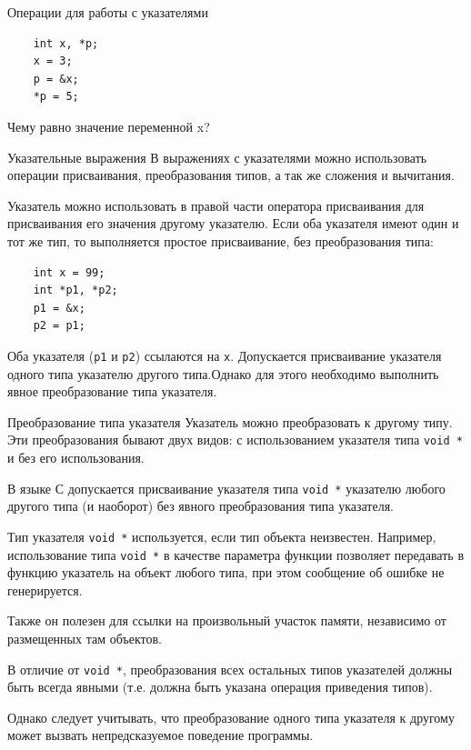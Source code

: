 \documentclass{beamer}
\begin{document}
\begin{frame}[fragile]{Операции для работы с указателями}
    \begin{verbatim}
    int x, *p;
    x = 3;
    p = &x;
    *p = 5;
    \end{verbatim}
    
    \medskip
    Чему равно значение переменной x?
\end{frame}

\begin{frame}[fragile]{Указательные выражения}
    В выражениях с указателями можно использовать операции присваивания, преобразования типов, а так же сложения и вычитания.
    
    \medskip
    Указатель можно использовать в правой части оператора присваивания для присваивания его значения другому указателю. Если оба указателя имеют один и тот же тип, то выполняется простое присваивание, без преобразования типа:
    \medskip
    \begin{verbatim}
    int x = 99;
    int *p1, *p2;
    p1 = &x;
    p2 = p1;
    \end{verbatim}
    \medskip
    
    Оба указателя (\texttt{p1} и \texttt{р2}) ссылаются на \texttt{х}. Допускается присваивание указателя одного типа указателю другого типа.Однако для этого необходимо выполнить явное преобразование типа указателя.
\end{frame}

\begin{frame}{Преобразование типа указателя}
    Указатель можно преобразовать к другому типу. Эти преобразования
    бывают двух видов: с использованием указателя типа \texttt{void *} и без его использования.
    
    \medskip
    В языке С допускается присваивание указателя типа \texttt{void *} указателю любого другого типа (и наоборот) без явного преобразования типа указателя.
    
    \medskip
    Тип указателя \texttt{void *} используется, если тип объекта неизвестен. Например, использование типа \texttt{void *} в качестве параметра функции позволяет передавать в функцию указатель на объект любого типа, при этом сообщение об ошибке не генерируется.
    
    Также он полезен для ссылки на произвольный участок памяти, независимо от размещенных там объектов.
    
    \medskip
    В отличие от \texttt{void *}, преобразования всех остальных типов указателей должны быть всегда явными (т.е. должна быть указана операция приведения типов).
    
    Однако следует учитывать, что преобразование одного типа указателя к другому может вызвать непредсказуемое поведение программы.
\end{frame}
\end{document}
